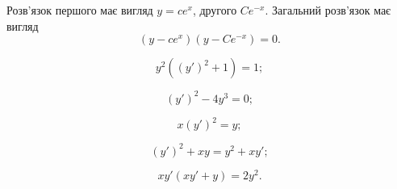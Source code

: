 \begin{enumerate}
\begin{solution}
		Розв'язок першого має вигляд $y = ce^x$, другого $Ce^{-x}$. Загальний роз\-в'яз\-ок має вигляд \[ (y - ce^x)(y-Ce^{-x})=0.\]
	\end{solution}
	
	\begin{multicols}{2}
		\begin{problem}
			\[y^2((y')^2+1)=1;\]
		\end{problem}
		
		\begin{problem}
			\[(y')^2-4y^3=0;\]
		\end{problem}
		
		\begin{problem}
			\[x(y')^2=y;\]
		\end{problem}
		
		\begin{problem}
			\[(y')^2+xy=y^2+xy';\]
		\end{problem}
		
		\begin{problem}
			\[xy'(xy'+y)=2y^2.\]
		\end{problem}
	\end{multicols}
\end{enumerate}